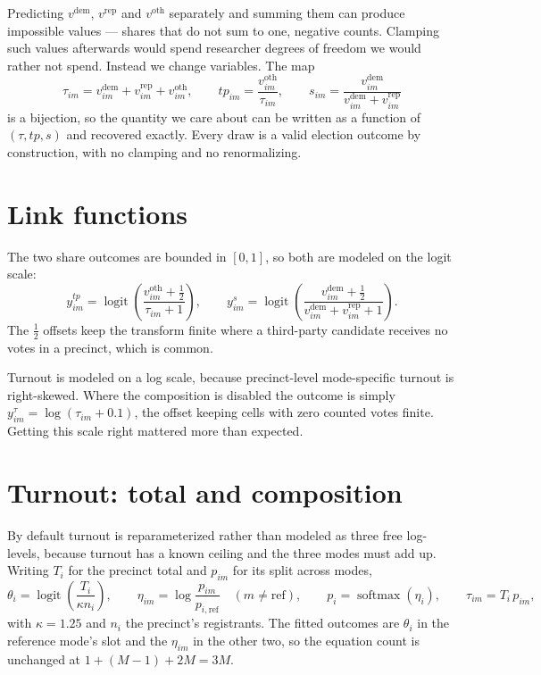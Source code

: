 \documentclass[11pt]{article}
\newcommand{\dem}{\mathrm{dem}}
\newcommand{\rep}{\mathrm{rep}}
\newcommand{\oth}{\mathrm{oth}}
\newcommand{\refm}{\mathrm{ref}}
\newcommand{\logit}{\operatorname{logit}}
\newcommand{\softmax}{\operatorname{softmax}}
\begin{document}
Predicting $v^{\dem}$, $v^{\rep}$ and $v^{\oth}$ separately and summing them can produce
impossible values --- shares that do not sum to one, negative counts. Clamping such
values afterwards would spend researcher degrees of freedom we would rather not spend.
Instead we change variables. The map
\begin{equation*}
  \tau_{im} = v^{\dem}_{im} + v^{\rep}_{im} + v^{\oth}_{im}, \qquad
  tp_{im}   = \frac{v^{\oth}_{im}}{\tau_{im}}, \qquad
  s_{im}    = \frac{v^{\dem}_{im}}{v^{\dem}_{im} + v^{\rep}_{im}}
\end{equation*}
is a bijection, so the quantity we care about can be written as a function of
$(\tau, tp, s)$ and recovered exactly. Every draw is a valid election outcome by
construction, with no clamping and no renormalizing.

\section{Link functions}

The two share outcomes are bounded in $[0,1]$, so both are modeled on the logit scale:
\begin{equation*}
  y^{tp}_{im} = \logit\!\left(\frac{v^{\oth}_{im} + \tfrac{1}{2}}{\tau_{im} + 1}\right),
  \qquad
  y^{s}_{im} = \logit\!\left(\frac{v^{\dem}_{im} + \tfrac{1}{2}}
                                  {v^{\dem}_{im} + v^{\rep}_{im} + 1}\right).
\end{equation*}
The $\tfrac{1}{2}$ offsets keep the transform finite where a third-party candidate
receives no votes in a precinct, which is common.

Turnout is modeled on a log scale, because precinct-level mode-specific turnout is
right-skewed. Where the composition is disabled the outcome is simply
$y^{\tau}_{im} = \log(\tau_{im} + 0.1)$, the offset keeping cells with zero counted votes
finite. Getting this scale right mattered more than expected.

\section{Turnout: total and composition}

By default turnout is reparameterized rather than modeled as three free log-levels,
because turnout has a known ceiling and the three modes must add up. Writing $T_i$ for
the precinct total and $p_{im}$ for its split across modes,
\begin{equation}
  \theta_i = \logit\!\left(\frac{T_i}{\kappa n_i}\right), \qquad
  \eta_{im} = \log\frac{p_{im}}{p_{i,\refm}} \quad (m \neq \refm), \qquad
  p_i = \softmax(\eta_i), \qquad
  \tau_{im} = T_i\, p_{im},
  \label{eq:compose}
\end{equation}
with $\kappa = 1.25$ and $n_i$ the precinct's registrants. The fitted outcomes are
$\theta_i$ in the reference mode's slot and the $\eta_{im}$ in the other two, so the
equation count is unchanged at $1 + (M-1) + 2M = 3M$.
\end{document}
